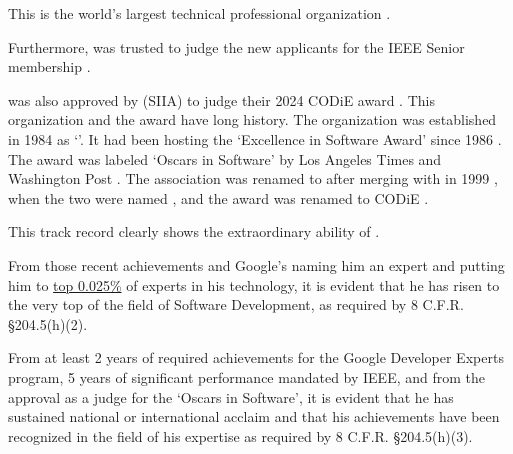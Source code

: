 This is the world's largest technical professional organization .

Furthermore, \mrl was trusted to judge the new applicants for the IEEE Senior membership
.

\mrl was also approved by \Siia (SIIA) to judge their 2024 CODiE award .
This organization and the award have long history.
The organization was established in 1984 as `\Spa'.
It had been hosting the `Excellence in Software Award' since 1986 .
The award was labeled `Oscars in Software' by Los Angeles Times 
and Washington Post .
The association was renamed to \Siia after merging with \Iia in 1999 ,
when the two were named ,
and the award was renamed to CODiE .

This track record clearly shows the extraordinary ability of \mrl.

From those recent achievements and Google's naming him an expert
and putting him to \ul{top 0.025\%} of experts in his technology,
it is evident that he has risen to the very top of the field of Software Development,
as required by 8 C.F.R. §204.5(h)(2).

From at least 2 years of required achievements for the Google Developer Experts program,
5 years of significant performance mandated by IEEE,
and from the approval as a judge for the `Oscars in Software',
it is evident that he has sustained national or international acclaim
and that his achievements have been recognized in the field of his expertise
as required by 8 C.F.R. §204.5(h)(3).

\pagebreak


%
%
%
%
%
%
%
%
